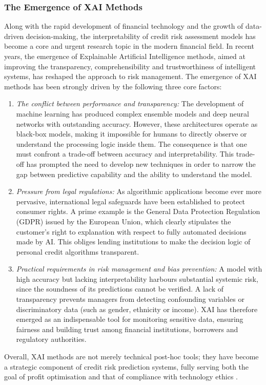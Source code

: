 \subsubsection{The Emergence of XAI Methods}
\noindent
Along with the rapid development of financial technology and the growth of data-driven decision-making, the interpretability of credit risk assessment models has become a core and urgent research topic in the modern financial field. In recent years, the emergence of Explainable Artificial Intelligence methods, aimed at improving the transparency, comprehensibility and trustworthiness of intelligent systems, has reshaped the approach to risk management.
\noindent
The emergence of XAI methods has been strongly driven by the following three core factors:
\begin{enumerate}
    \item \textit{The conflict between performance and transparency:} The development of machine learning has produced complex ensemble models and deep neural networks with outstanding accuracy. However, these architectures operate as black-box models, making it impossible for humans to directly observe or understand the processing logic inside them. The consequence is that one must confront a trade-off between accuracy and interpretability. This trade-off has prompted the need to develop new techniques in order to narrow the gap between predictive capability and the ability to understand the model.
    
    \item \textit{Pressure from legal regulations:} As algorithmic applications become ever more pervasive, international legal safeguards have been established to protect consumer rights. A prime example is the General Data Protection Regulation (GDPR) issued by the European Union, which clearly stipulates the customer's right to explanation with respect to fully automated decisions made by AI. This obliges lending institutions to make the decision logic of personal credit algorithms transparent.
    
    \item \textit{Practical requirements in risk management and bias prevention:} A model with high accuracy but lacking interpretability harbours substantial systemic risk, since the soundness of its predictions cannot be verified. A lack of transparency prevents managers from detecting confounding variables or discriminatory data (such as gender, ethnicity or income). XAI has therefore emerged as an indispensable tool for monitoring sensitive data, ensuring fairness and building trust among financial institutions, borrowers and regulatory authorities.
\end{enumerate}
Overall, XAI methods are not merely technical post-hoc tools; they have become a strategic component of credit risk prediction systems, fully serving both the goal of profit optimisation and that of compliance with technology ethics \cite{liu2024credit}.


